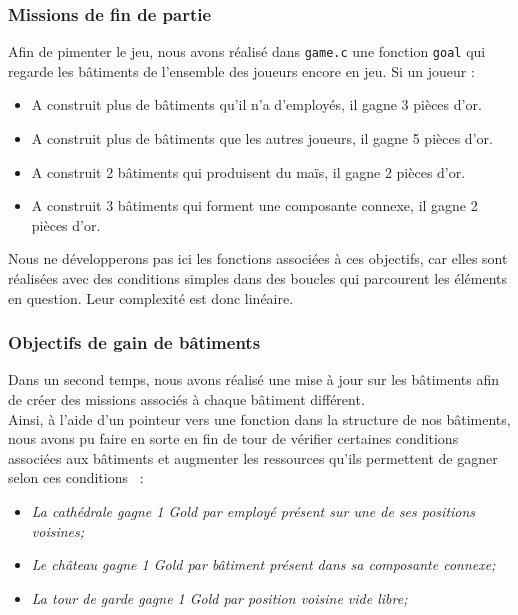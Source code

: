 \subsubsection{Missions de fin de partie}
Afin de pimenter le jeu, nous avons réalisé dans \texttt{game.c} une fonction \texttt{goal} qui regarde les bâtiments de l'ensemble des joueurs encore en jeu. Si un joueur :
\begin{itemize}
    \setlength\itemsep{0.01em}
    \item A construit plus de bâtiments qu'il n'a d'employés, il gagne 3 pièces d'or.
    \item A construit plus de bâtiments que les autres joueurs, il gagne 5 pièces d'or.
    \item A construit 2 bâtiments qui produisent du maïs, il gagne 2 pièces d'or.
    \item A construit 3 bâtiments qui forment une composante connexe, il gagne 2 pièces d'or.
\end{itemize}
Nous ne développerons pas ici les fonctions associées à ces objectifs, car elles sont réalisées avec des conditions simples dans des boucles qui parcourent les éléments en question. Leur complexité est donc linéaire.

\subsubsection{Objectifs de gain de bâtiments}
Dans un second temps, nous avons réalisé une mise à jour sur les bâtiments afin de créer des missions associés à chaque bâtiment différent.\\
Ainsi, à l'aide d'un pointeur vers une fonction dans la structure de nos bâtiments, nous avons pu faire en sorte en fin de tour de vérifier certaines conditions associées aux bâtiments et augmenter les ressources qu'ils permettent de gagner selon ces conditions~\cite{renault2024} :
\begin{itemize}
    \setlength\itemsep{0.01em}
    \item \textit{La cathédrale gagne 1 Gold par employé présent sur une de ses positions voisines;}
    \item \textit{Le château gagne 1 Gold par bâtiment présent dans sa composante connexe;}
    \item \textit{La tour de garde gagne 1 Gold par position voisine vide libre;}
\end{itemize}

